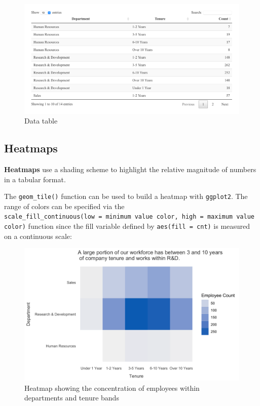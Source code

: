 \documentclass[
]{book}
\begin{document}
\begin{figure}

{\centering \includegraphics[width=1\linewidth]{graphics/data_table} 

}

\caption{Data table}\label{fig:table}
\end{figure}

\hypertarget{heatmaps}{%
\subsection{Heatmaps}\label{heatmaps}}

\textbf{Heatmaps} use a shading scheme to highlight the relative magnitude of numbers in a tabular format.

The \texttt{geom\_tile()} function can be used to build a heatmap with \texttt{ggplot2}. The range of colors can be specified via the \texttt{scale\_fill\_continuous(low\ =\ \textquotesingle{}minimum\ value\ color\textquotesingle{},\ high\ =\ \textquotesingle{}maximum\ value\ color\textquotesingle{})} function since the fill variable defined by \texttt{aes(fill\ =\ cnt)} is measured on a continuous scale:

\begin{figure}

{\centering \includegraphics[width=1\linewidth]{graphics/heatmap} 

}

\caption{Heatmap showing the concentration of employees within departments and tenure bands}\label{fig:heatmap}
\end{figure}
\end{document}
